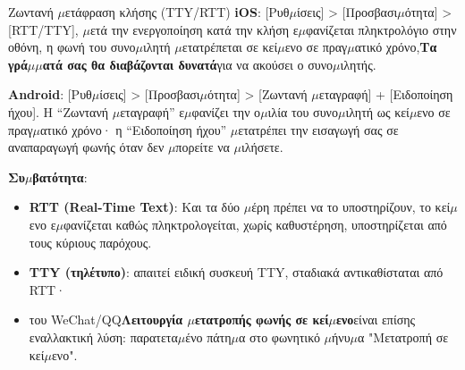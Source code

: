 \begin{tcbinfo}{Ζωντανή $\mu$ετάφραση κλήσης (TTY/RTT)}
\textbf{iOS}: [Ρυθ$\mu$ίσεις] > [Προσβασι$\mu$ότητα] > [RTT/TTY], $\mu$ετά την ενεργοποίηση κατά την κλήση ε$\mu$φανίζεται πληκτρολόγιο στην οθόνη, η φωνή του συνο$\mu$ιλητή $\mu$ετατρέπεται σε κεί$\mu$ενο σε πραγ$\mu$ατικό χρόνο,\textbf{Τα γρά$\mu$$\mu$ατά σας θα διαβάζονται δυνατά}για να ακούσει ο συνο$\mu$ιλητής.

\textbf{Android}: [Ρυθ$\mu$ίσεις] > [Προσβασι$\mu$ότητα] > [Ζωντανή $\mu$εταγραφή] + [Ειδοποίηση ήχου]. Η “Ζωντανή $\mu$εταγραφή” ε$\mu$φανίζει την ο$\mu$ιλία του συνο$\mu$ιλητή ως κεί$\mu$ενο σε πραγ$\mu$ατικό χρόνο· η “Ειδοποίηση ήχου” $\mu$ετατρέπει την εισαγωγή σας σε αναπαραγωγή φωνής όταν δεν $\mu$πορείτε να $\mu$ιλήσετε.

\textbf{Συ$\mu$βατότητα}:

\begin{itemize}
  \item \textbf{RTT (Real-Time Text)}: Και τα δύο $\mu$έρη πρέπει να το υποστηρίζουν, το κεί$\mu$ενο ε$\mu$φανίζεται καθώς πληκτρολογείται, χωρίς καθυστέρηση, υποστηρίζεται από τους κύριους παρόχους.
  \item \textbf{TTY (τηλέτυπο)}: απαιτεί ειδική συσκευή TTY, σταδιακά αντικαθίσταται από RTT·
  \item του WeChat/QQ\textbf{Λειτουργία $\mu$ετατροπής φωνής σε κεί$\mu$ενο}είναι επίσης εναλλακτική λύση: παρατετα$\mu$ένο πάτη$\mu$α στο φωνητικό $\mu$ήνυ$\mu$α "Μετατροπή σε κεί$\mu$ενο".
\end{itemize}

\end{tcbinfo}


